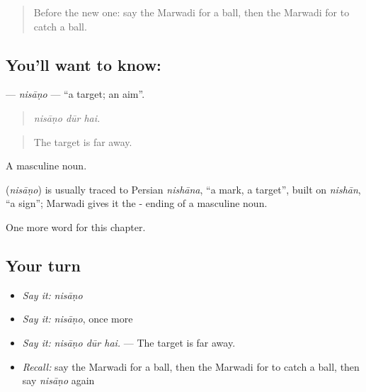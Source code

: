 \label{lesson:MW-C280-nisano}



\begin{quote}
Before the new one: say the Marwadi for a ball, then the Marwadi for to catch a ball.
\end{quote}

\subsection*{You'll want to know: }
\textbf{} — \emph{nisāṇo} — \textquotedblleft{}a target; an aim\textquotedblright{}.

\begin{quote}
  
\end{quote}

\begin{quote}
\emph{nisāṇo dūr hai.}
\end{quote}

\begin{quote}
The target is far away.
\end{quote}

A masculine noun.

\begin{cousinweb}
\textbf{} (\emph{nisāṇo}) is usually traced to Persian \emph{nishāna}, \textquotedblleft{}a mark, a target\textquotedblright{}, built on \emph{nishān}, \textquotedblleft{}a sign\textquotedblright{}; Marwadi gives it the - ending of a masculine noun.
\end{cousinweb}

\begin{grammarlens}[title={What you've built}]
One more word for this chapter.
\end{grammarlens}

\subsection*{Your turn}
\begin{itemize}
\raggedright
  \item \emph{Say it:} \emph{nisāṇo}
  \item \emph{Say it:} \emph{nisāṇo}, once more
  \item \emph{Say it:} \emph{nisāṇo dūr hai.} — The target is far away.
  \item \emph{Recall:} say the Marwadi for a ball, then the Marwadi for to catch a ball, then say \emph{nisāṇo} again
\end{itemize}

